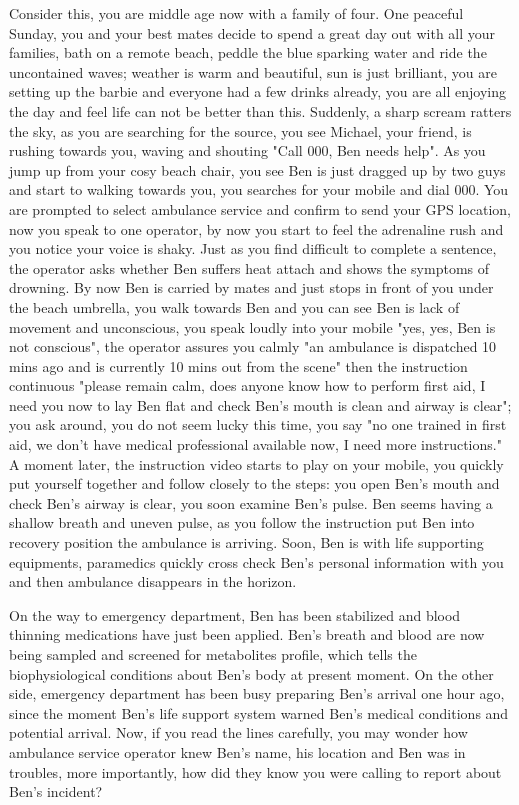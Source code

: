 Consider this, you are middle age now with a family of four. One peaceful Sunday, you and your best mates decide to spend a great day out with all your families, bath on a remote beach, peddle the blue sparking water and ride the uncontained waves; weather is warm and beautiful, sun is just brilliant, you are setting up the barbie and everyone had a few drinks already, you are all enjoying the day and feel life can not be better than this. Suddenly, a sharp scream ratters the sky, as you are searching for the source, you see Michael, your friend, is rushing towards you, waving and shouting "Call 000, Ben needs help". As you jump up from your cosy beach chair, you see Ben is just dragged up by two guys and start to walking towards you, you searches for your mobile and dial 000. You are prompted to select ambulance service and confirm to send your GPS location, now you speak to one operator, by now you start to feel the adrenaline rush and you notice your voice is shaky. Just as you find difficult to complete a sentence, the operator asks whether Ben suffers heat attach and shows the symptoms of drowning. By now Ben is carried by mates and just stops in front of you under the beach umbrella, you walk towards Ben and you can see Ben is lack of movement and unconscious, you speak loudly into your mobile "yes, yes, Ben is not conscious", the operator assures you calmly "an ambulance is dispatched 10 mins ago and is currently 10 mins out from the scene" then the instruction continuous "please remain calm, does anyone know how to perform first aid, I need you now to lay Ben flat and check Ben's mouth is clean and airway is clear"; you ask around, you do not seem lucky this time, you say "no one trained in first aid, we don't have medical professional available now, I need more instructions." \\
A moment later, the instruction video starts to play on your mobile, you quickly put yourself together and follow closely to the steps: you open Ben's mouth and check Ben's airway is clear, you soon examine Ben's pulse. Ben seems having a shallow breath and uneven pulse, as you follow the instruction put Ben into recovery position the ambulance is arriving. Soon, Ben is with life supporting equipments, paramedics quickly cross check Ben's personal information with you and then ambulance disappears in the horizon. \par
On the way to emergency department, Ben has been stabilized and blood thinning medications have just been applied. Ben's breath and blood are now being sampled and screened for metabolites profile, which tells the biophysiological conditions about Ben's body at present moment. On the other side, emergency department has been busy preparing Ben's arrival one hour ago, since the moment Ben's life support system warned Ben's medical conditions and potential arrival. Now, if you read the lines carefully, you may wonder how ambulance service operator knew Ben's name, his location and Ben was in troubles, more importantly, how did they know you were calling to report about Ben's incident?  \\
